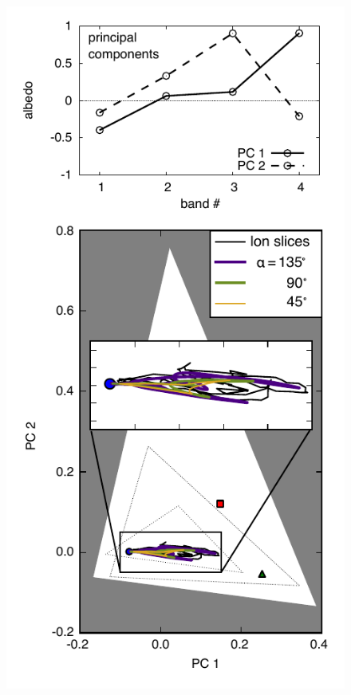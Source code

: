 \documentclass[iop,numberedappendix,apj,]{emulateapj}
\begin{document}
\begin{figure}[t]
    \begin{center}
\includegraphics[width=\hsize]{mockdata_PCplane.pdf}
    \end{center}

\end{figure}
\end{document}
